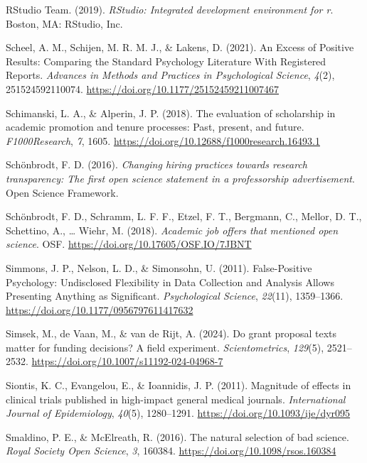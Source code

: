 \documentclass[
  british,
  a4paper,
  ,man,mask,floatsintext]{apa6}
\newlength{\cslhangindent}
\newenvironment{CSLReferences}[2] %
 {\begin{list}{}{%
  \setlength{\itemindent}{0pt}
  \setlength{\leftmargin}{0pt}
  \setlength{\parsep}{0pt}
  \ifodd #1
   \setlength{\leftmargin}{\cslhangindent}
   \setlength{\itemindent}{-1\cslhangindent}
  \fi
  \setlength{\itemsep}{#2\baselineskip}}}
 {\end{list}}
\begin{document}
\begin{CSLReferences}{1}{0}
RStudio Team. (2019). \emph{{RStudio}: {Integrated} development environment for r}. Boston, MA: RStudio, Inc.

Scheel, A. M., Schijen, M. R. M. J., \& Lakens, D. (2021). An {Excess} of {Positive Results}: {Comparing} the {Standard Psychology Literature With Registered Reports}. \emph{Advances in Methods and Practices in Psychological Science}, \emph{4}(2), 251524592110074. \url{https://doi.org/10.1177/25152459211007467}

Schimanski, L. A., \& Alperin, J. P. (2018). The evaluation of scholarship in academic promotion and tenure processes: {Past}, present, and future. \emph{F1000Research}, \emph{7}, 1605. \url{https://doi.org/10.12688/f1000research.16493.1}

Schönbrodt, F. D. (2016). \emph{Changing hiring practices towards research transparency: {The} first open science statement in a professorship advertisement}. Open Science Framework.

Schönbrodt, F. D., Schramm, L. F. F., Etzel, F. T., Bergmann, C., Mellor, D. T., Schettino, A., \ldots{} Wiehr, M. (2018). \emph{Academic job offers that mentioned open science}. OSF. \url{https://doi.org/10.17605/OSF.IO/7JBNT}

Simmons, J. P., Nelson, L. D., \& Simonsohn, U. (2011). False-{Positive Psychology}: {Undisclosed Flexibility} in {Data Collection} and {Analysis Allows Presenting Anything} as {Significant}. \emph{Psychological Science}, \emph{22}(11), 1359--1366. \url{https://doi.org/10.1177/0956797611417632}

Simsek, M., de Vaan, M., \& van de Rijt, A. (2024). Do grant proposal texts matter for funding decisions? {A} field experiment. \emph{Scientometrics}, \emph{129}(5), 2521--2532. \url{https://doi.org/10.1007/s11192-024-04968-7}

Siontis, K. C., Evangelou, E., \& Ioannidis, J. P. (2011). Magnitude of effects in clinical trials published in high-impact general medical journals. \emph{International Journal of Epidemiology}, \emph{40}(5), 1280--1291. \url{https://doi.org/10.1093/ije/dyr095}

Smaldino, P. E., \& McElreath, R. (2016). The natural selection of bad science. \emph{Royal Society Open Science}, \emph{3}, 160384. \url{https://doi.org/10.1098/rsos.160384}


\end{CSLReferences}
\end{document}

